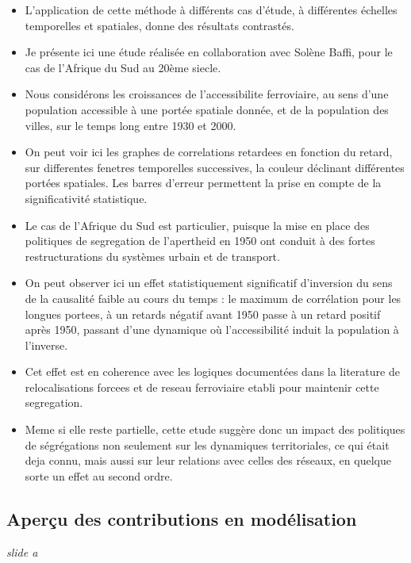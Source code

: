 \documentclass[12pt]{article}
\begin{document}
\begin{itemize}
	\item L'application de cette méthode à différents cas d'étude, à différentes échelles temporelles et spatiales, donne des résultats contrastés.
	\item Je présente ici une étude réalisée en collaboration avec Solène Baffi, pour le cas de l'Afrique du Sud au 20ème siecle.
	\item Nous considérons les croissances de l'accessibilite ferroviaire, au sens d'une population accessible à une portée spatiale donnée, et de la population des villes, sur le temps long entre 1930 et 2000.
	\item On peut voir ici les graphes de correlations retardees en fonction du retard, sur differentes fenetres temporelles successives, la couleur déclinant différentes portées spatiales. Les barres d'erreur permettent la prise en compte de la significativité statistique.
	\item Le cas de l'Afrique du Sud est particulier, puisque la mise en place des politiques de segregation de l'apertheid en 1950 ont conduit à des fortes restructurations du systèmes urbain et de transport. 
	\item On peut observer ici un effet statistiquement significatif d'inversion du sens de la causalité faible au cours du temps : le maximum de corrélation pour les longues portees, à un retards négatif avant 1950 passe à un retard positif après 1950, passant d'une dynamique où l'accessibilité induit la population à l'inverse.
	\item Cet effet est en coherence avec les logiques documentées dans la literature de relocalisations forcees et de reseau ferroviaire etabli pour maintenir cette segregation.
	\item Meme si elle reste partielle, cette etude suggère donc un impact des politiques de ségrégations non seulement sur les dynamiques territoriales, ce qui était deja connu, mais aussi sur leur relations avec celles des réseaux, en quelque sorte un effet au second ordre.
\end{itemize}


\newpage


\subsection*{Aperçu des contributions en modélisation}

\textit{slide a}
\end{document}
